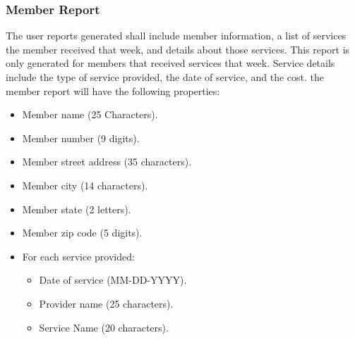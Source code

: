 \documentclass{article}
\begin{document}
\subsubsection{Member Report}
The user reports generated shall include member information, a list of services the member received that week, and details about those services. This report is only generated for members that received services that week. Service details include the type of service provided, the date of service, and the cost. the member report will have the following properties:
\begin{itemize}
\item Member name (25 Characters).
\item Member number (9 digits).
\item Member street address (35  characters).
\item Member city (14 characters).
\item Member state (2 letters).
\item Member zip code (5 digits).
\item For each service provided:
\begin{itemize}
\item Date of service (MM-DD-YYYY).
\item Provider name (25 characters).
\item Service Name (20 characters).
\end{itemize}
\end{itemize}
\end{document}
